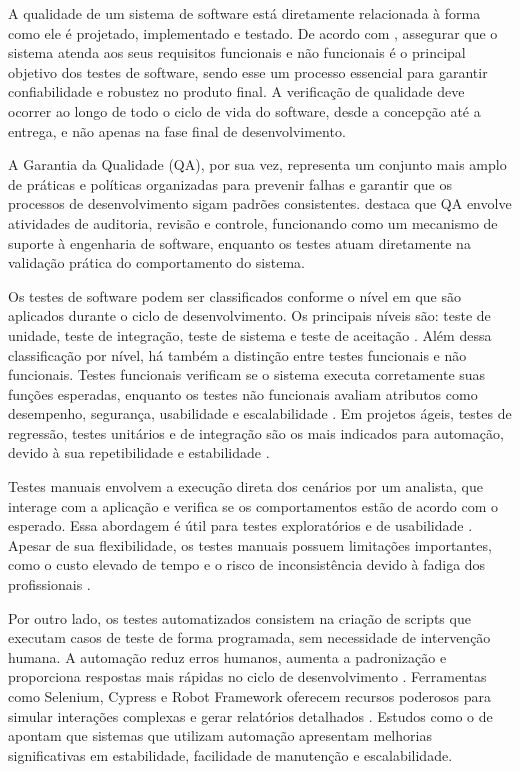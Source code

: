 \documentclass{UNESC}
\begin{document}
A qualidade de um sistema de software está diretamente relacionada à forma como ele é projetado, implementado e testado. De acordo com , assegurar que o sistema atenda aos seus requisitos funcionais e não funcionais é o principal objetivo dos testes de software, sendo esse um processo essencial para garantir confiabilidade e robustez no produto final. A verificação de qualidade deve ocorrer ao longo de todo o ciclo de vida do software, desde a concepção até a entrega, e não apenas na fase final de desenvolvimento.

A Garantia da Qualidade (QA), por sua vez, representa um conjunto mais amplo de práticas e políticas organizadas para prevenir falhas e garantir que os processos de desenvolvimento sigam padrões consistentes.  destaca que QA envolve atividades de auditoria, revisão e controle, funcionando como um mecanismo de suporte à engenharia de software, enquanto os testes atuam diretamente na validação prática do comportamento do sistema.

Os testes de software podem ser classificados conforme o nível em que são aplicados durante o ciclo de desenvolvimento. Os principais níveis são: teste de unidade, teste de integração, teste de sistema e teste de aceitação . Além dessa classificação por nível, há também a distinção entre testes funcionais e não funcionais. Testes funcionais verificam se o sistema executa corretamente suas funções esperadas, enquanto os testes não funcionais avaliam atributos como desempenho, segurança, usabilidade e escalabilidade \cite{myers2012}. Em projetos ágeis, testes de regressão, testes unitários e de integração são os mais indicados para automação, devido à sua repetibilidade e estabilidade .

Testes manuais envolvem a execução direta dos cenários por um analista, que interage com a aplicação e verifica se os comportamentos estão de acordo com o esperado. Essa abordagem é útil para testes exploratórios e de usabilidade \cite{PRESSMAN}. Apesar de sua flexibilidade, os testes manuais possuem limitações importantes, como o custo elevado de tempo e o risco de inconsistência devido à fadiga dos profissionais \cite{gandini2002}.

Por outro lado, os testes automatizados consistem na criação de scripts que executam casos de teste de forma programada, sem necessidade de intervenção humana. A automação reduz erros humanos, aumenta a padronização e proporciona respostas mais rápidas no ciclo de desenvolvimento . Ferramentas como Selenium, Cypress e Robot Framework oferecem recursos poderosos para simular interações complexas e gerar relatórios detalhados \cite{souza_automacao_2023}. Estudos como o de  apontam que sistemas que utilizam automação apresentam melhorias significativas em estabilidade, facilidade de manutenção e escalabilidade.
\end{document}
